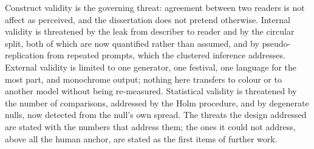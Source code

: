 Construct validity is the governing threat: agreement between two readers is not affect as perceived, and the dissertation does not pretend otherwise. Internal validity is threatened by the leak from describer to reader and by the circular split, both of which are now quantified rather than assumed, and by pseudo-replication from repeated prompts, which the clustered inference addresses. External validity is limited to one generator, one festival, one language for the most part, and monochrome output; nothing here transfers to colour or to another model without being re-measured. Statistical validity is threatened by the number of comparisons, addressed by the Holm procedure, and by degenerate nulls, now detected from the null's own spread. The threats the design addressed are stated with the numbers that address them; the ones it could not address, above all the human anchor, are stated as the first items of further work.
